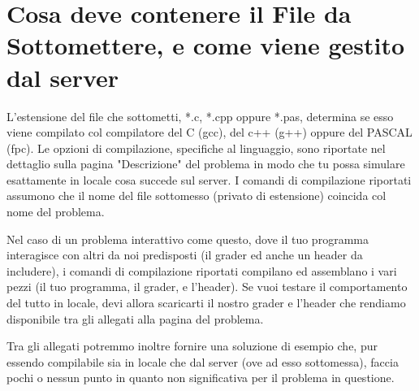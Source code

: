 \documentclass[a4paper,11pt]{article}
\begin{document}
  \section*{Cosa deve contenere il File da Sottomettere, e come viene gestito dal server}

  L'estensione del file che sottometti, *.c, *.cpp oppure *.pas,
  determina se esso viene compilato col compilatore del C (gcc),
  del c++ (g++) oppure del PASCAL (fpc).
  Le opzioni di compilazione, specifiche al linguaggio,
  sono riportate nel dettaglio sulla pagina "Descrizione" del problema
  in modo che tu possa simulare esattamente in locale cosa succede sul server.
  I comandi di compilazione riportati assumono che il nome del file sottomesso (privato di estensione) coincida col nome del problema.

  Nel caso di un problema interattivo come questo,
  dove il tuo programma interagisce con altri da noi predisposti
  (il grader ed anche un header da includere), i comandi di compilazione riportati compilano ed assemblano i vari pezzi (il tuo programma, il grader, e l'header).
  Se vuoi testare il comportamento del tutto in locale,
  devi allora scaricarti il nostro grader e l'header che rendiamo disponibile tra gli allegati alla pagina del problema.

  Tra gli allegati potremmo inoltre fornire una soluzione di esempio che,
  pur essendo compilabile sia in locale che dal server (ove ad esso sottomessa),
  faccia pochi o nessun punto in quanto non significativa per il problema
  in questione.
  
\end{document}
